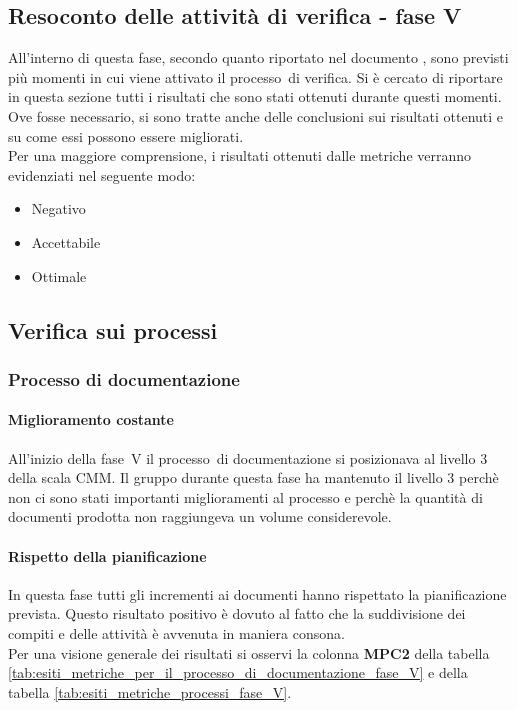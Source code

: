 \documentclass[../PianoDiQualifica.tex]{subfiles}
\begin{document}
\begin{appendices}
\section{Resoconto delle attività di verifica - fase V}
All'interno di questa fase\g, secondo quanto riportato nel documento \pianodiprogetto, sono previsti più momenti in cui viene attivato il processo\g\ di verifica. Si è cercato di riportare in questa sezione tutti i risultati che sono stati ottenuti durante questi momenti. Ove fosse necessario, si sono tratte anche delle conclusioni sui risultati ottenuti e su come essi possono essere migliorati.\\
Per una maggiore comprensione, i risultati ottenuti dalle metriche verranno evidenziati nel seguente modo: 
\begin{itemize} 
	\item {\color{red}Negativo} 
	\item Accettabile 
	\item {\color{dkgreen}Ottimale}
\end{itemize}  
	
	\subsection{Verifica sui processi}
		\subsubsection{Processo di documentazione}
			\paragraph{Miglioramento costante}
			All'inizio della fase\g\ V il processo\g\ di documentazione si posizionava al livello 3 della scala CMM\g.
			Il gruppo durante questa fase ha mantenuto il livello 3 perchè non ci sono stati importanti miglioramenti al processo e perchè la quantità di documenti prodotta non raggiungeva un volume considerevole.
			
			\paragraph{Rispetto della pianificazione}
			In questa fase tutti gli incrementi ai documenti hanno rispettato la pianificazione prevista. Questo risultato positivo è dovuto al fatto che la suddivisione dei compiti e delle attività è avvenuta in maniera consona.\\ 
			Per una visione generale dei risultati si osservi la colonna \textbf{MPC2}  della tabella \ref{tab:esiti_metriche_per_il_processo_di_documentazione_fase_V} e della tabella \ref{tab:esiti_metriche_processi_fase_V}.
			

\end{appendices}
\end{document}

